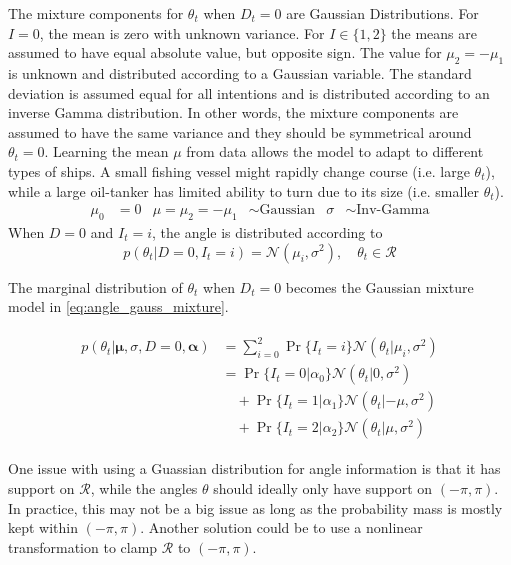 The mixture components for $\theta_t$ when $D_t=0$ are Gaussian Distributions. For $I=0$, the mean is zero with unknown variance. For $I \in \{1, 2\}$ the means are assumed to have equal absolute value, but opposite sign. The value for $\mu_2 = -\mu_1$ is unknown and distributed according to a Gaussian variable. The standard deviation is assumed equal for all intentions and is distributed according to an inverse Gamma distribution. In other words, the mixture components are assumed to have the same variance and they should be symmetrical around $\theta_t=0$.
Learning the mean $\mu$ from data allows the model to adapt to different types of ships. A small fishing vessel might rapidly change course (i.e. large $\theta_t$), while a large oil-tanker has limited ability to turn due to its size (i.e. smaller $\theta_t$). 
\begin{align}
    \mu_0 &= 0 &  \mu = \mu_{2} = - \mu_{1} &\sim \text{Gaussian} & \sigma &\sim \text{Inv-Gamma}
\end{align}
When $D=0$ and $I_t=i$, the angle is distributed according to
\begin{equation}\label{eq:theta_intention_mixture}
    p(\theta_t | D=0, I_t=i) = \mathcal{N}(\mu_i, \sigma^2), \quad \theta_t \in \mathcal{R}
\end{equation}

The marginal distribution of $\theta_t$ when $D_t=0$ becomes the Gaussian mixture model in \cref{eq:angle_gauss_mixture}.

\begin{align}\label{eq:angle_gauss_mixture}
\begin{split}
    p(\theta_t | \boldsymbol{\mu}, \sigma, D=0, \boldsymbol{\alpha}) &= \sum_{i=0}^2 \Pr\{I_t=i\}\mathcal{N}(\theta_t | \mu_i, \sigma^2) \\
    &=\Pr\{I_t=0 | \alpha_0\}\mathcal{N}(\theta_t | 0, \sigma^2)\\
    &\quad+\Pr\{I_t=1 | \alpha_1\}\mathcal{N}(\theta_t | -\mu, \sigma^2)\\
    &\quad+\Pr\{I_t=2 | \alpha_2\}\mathcal{N}(\theta_t | \mu, \sigma^2)
\end{split}
\end{align}

One issue with using a Guassian distribution for angle information is that it has support on $\mathcal{R}$, while the angles $\theta$ should ideally only have support on $(-\pi, \pi)$. In practice, this may not be a big issue as long as the probability mass is mostly kept within $(-\pi, \pi)$. Another solution could be to use a nonlinear transformation to clamp $\mathcal{R}$ to $(-\pi, \pi)$.

